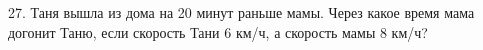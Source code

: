 27. Таня вышла из дома на 20 минут раньше мамы. Через какое время мама догонит Таню, если скорость Тани 6 км/ч, а скорость мамы 8 км/ч?\\
